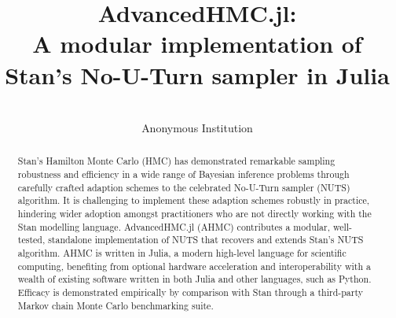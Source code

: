 \documentclass[tablecaption=bottom,wcp]{jmlr} %
\title[AdvancedHMC.jl:\\\large A modular implementation of Stan's No-U-Turn sampler]{AdvancedHMC.jl:\\\large A modular implementation of Stan's No-U-Turn sampler in Julia}
\author{\Name{Anonymous Authors}\\
  \addr Anonymous Institution}
\def\ahmc{\texttt{AHMC}}
\def\ahmcfull{\texttt{AdvancedHMC.jl}}
\def\stan{\texttt{Stan}}
\def\turing{\texttt{Turing}}
\begin{document}
\maketitle


\begin{abstract}
 Stan's Hamilton Monte Carlo (HMC) has demonstrated remarkable sampling robustness and efficiency in a wide range of Bayesian inference problems through carefully crafted adaption schemes to the celebrated No-U-Turn sampler (NUTS) algorithm.  It is challenging to implement these adaption schemes robustly in practice, hindering wider adoption amongst practitioners who are not directly working with the Stan modelling language. AdvancedHMC.jl (AHMC) contributes a modular, well-tested, standalone implementation of NUTS that recovers and extends Stan's NUTS algorithm. AHMC is written in Julia, a modern high-level language for scientific computing, benefiting from optional hardware acceleration and interoperability with a wealth of existing software written in both Julia and other languages, such as Python. Efficacy is demonstrated empirically by comparison with Stan through a third-party Markov chain Monte Carlo benchmarking suite.
\end{abstract}

\end{document}
